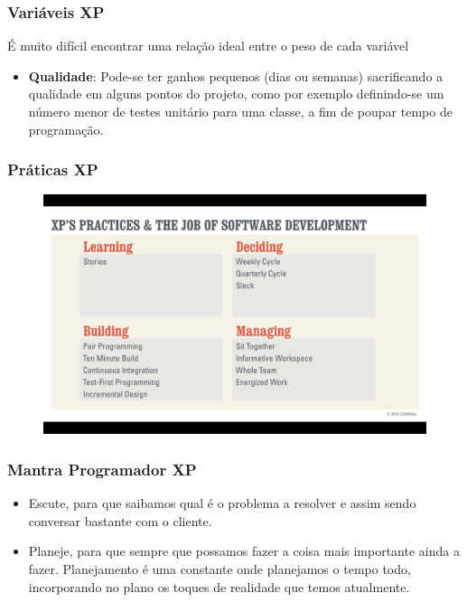 \begin{frame}
 \frametitle{Variáveis XP}
 É muito difícil encontrar uma relação ideal entre o peso de cada variável
 \begin{itemize}
  \item \textbf{Qualidade}:  Pode-se ter ganhos pequenos (dias ou semanas) sacrificando a qualidade em alguns pontos do projeto, como por exemplo definindo-se um número menor de testes unitário para uma classe, a fim de poupar tempo de programação.
 \end{itemize}
\end{frame}

\begin{frame}
 \frametitle{Práticas XP}
  \begin{figure}
   \centering
   \includegraphics[width = \textwidth]{figs/xp_etapas.png}
  \end{figure}
\end{frame}

\begin{frame}
 \frametitle{Mantra Programador XP}
 \begin{itemize}
  \item Escute, para que saibamos qual é o problema a resolver e assim sendo conversar bastante com o cliente.
  \item Planeje, para que sempre que possamos fazer a coisa mais importante ainda a fazer. Planejamento é uma constante onde planejamos o tempo todo, incorporando no plano os toques de realidade que temos atualmente.
 \end{itemize}
\end{frame}

